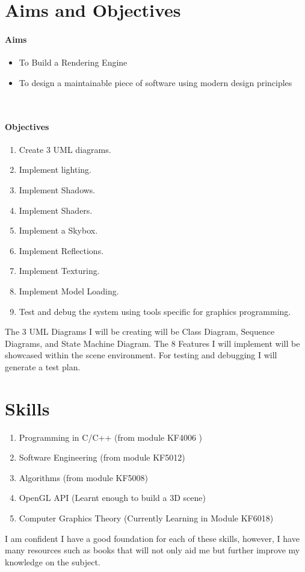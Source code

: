 \section{Aims and Objectives}
\paragraph{Aims}
\begin{itemize}
  \item To Build a Rendering Engine
  \item To design a maintainable piece of software using modern design principles
\end{itemize}
\\
\paragraph{Objectives}
\begin{enumerate}
  \item Create 3 UML diagrams.
  \item Implement lighting.
  \item Implement Shadows.
  \item Implement Shaders.
  \item Implement a Skybox.
  \item Implement Reflections.
  \item Implement Texturing.
  \item Implement Model Loading.
  \item Test and debug the system using tools specific for graphics programming.  
\end{enumerate}
The 3 UML Diagrams I will be creating will be Class Diagram, Sequence Diagrams, and State Machine Diagram. The 8 Features I will implement will be showcased within the scene environment. For testing and debugging I will generate a test plan.
\section{Skills}
\begin{enumerate}
    \item Programming in C/C++ (from module KF4006 )
    \item Software Engineering (from module KF5012)
    \item Algorithms (from module KF5008) 
    \item OpenGL API (Learnt enough to build a 3D scene) 
    \item Computer Graphics Theory (Currently Learning in Module KF6018)
\end{enumerate}
I am confident I have a good foundation for each of these skills, however, I have many resources such as books that will not only aid me but further improve my knowledge on the subject. 
